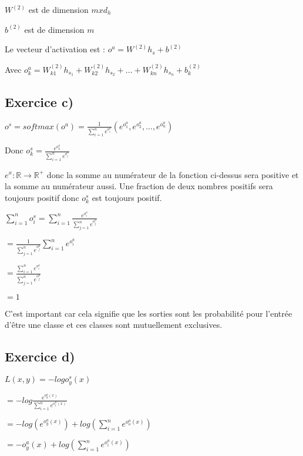 \documentclass[a4paper,10pt]{article}
\begin{document}
$W^{(2)}$ est de dimension $m x d_{h}$

$b^{(2)}$ est de dimension $m$

Le vecteur d'activation est : $o^{a} = W^{(2)} h_{s} + b^{(2)}$

Avec $o^{a}_{k} = W^{(2)}_{k1} h_{s_1} + W^{(2)}_{k2} h_{s_2} + ... + W^{(2)}_{kn} h_{s_n} + b^{(2)}_{k}$

\subsection{Exercice c)}

$o^{s} = softmax(o^{a}) = \frac{1}{\sum_{i=1}^{n} e^{o^{a}_{i}}}  (e^{o^{a}_{1}}, e^{o^{a}_{2}}, ..., e^{o^{a}_{n}})$

Donc $o^{s}_{k} = \frac{e^{o^{a}_{k}}}{\sum_{i=1}^{n} e^{o^{a}_{i}}}$

$e^{x} : \mathds{R} \rightarrow \mathds{R}^{+}$ donc la somme au numérateur de la fonction ci-dessus sera positive et la somme au numérateur aussi. Une fraction de deux nombres positifs sera toujours positif donc $o^{s}_{k}$ est toujours positif.

$\sum^{n}_{i=1} o^{s}_{i} = \sum^{n}_{i=1} \frac{e^{o^{a}_{i}}}{\sum_{j=1}^{n} e^{o^{a}_{j}}}$

$ = \frac{1}{\sum_{j=1}^{n} e^{o^{a}_{j}}} \sum^{n}_{i=1} e^{o^{a}_{i}}$

$ = \frac{\sum^{n}_{i=1} e^{o^{a}_{i}}}{\sum_{j=1}^{n} e^{o^{a}_{j}}}$

$ =1 $


C'est important car cela signifie que les sorties sont les probabilité pour l'entrée d'être une classe et ces classes sont mutuellement exclusives.
 
\subsection{Exercice d)}

$ L(x,y) = -log  o^{s}_{y}(x) $

$= -log \frac{e^{o^{a}_{y}(x)}}{\sum_{i=1}^{n} e^{o^{a}_{i}(x)}}$ 

$= -log(e^{o^{a}_{y}(x)}) +log(\sum_{i=1}^{n} e^{o^{a}_{o}(x)})  $

$ = -o^{a}_{y}(x) + log(\sum_{i=1}^{n} e^{o^{a}_{i}(x)})$ 
\end{document}
